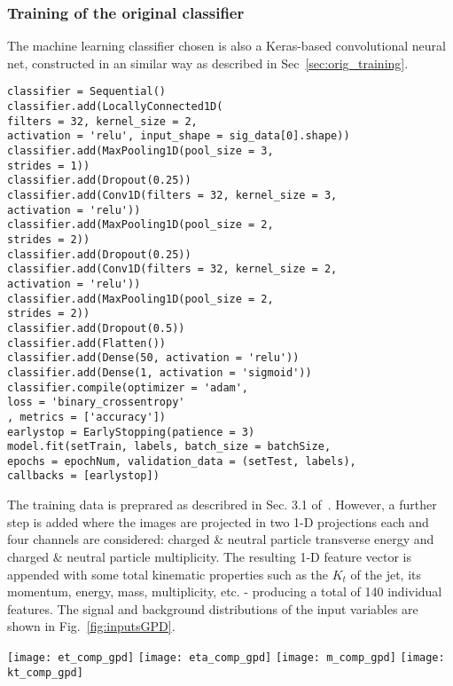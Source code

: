 \subsubsection{Training of the original classifier}

The machine learning classifier chosen is also a Keras-based convolutional neural net,
constructed in an similar way as described in Sec~\ref{sec:orig_training}.
\begin{lstlisting}
classifier = Sequential()
classifier.add(LocallyConnected1D(
filters = 32, kernel_size = 2,
activation = 'relu', input_shape = sig_data[0].shape))
classifier.add(MaxPooling1D(pool_size = 3,
strides = 1))
classifier.add(Dropout(0.25))
classifier.add(Conv1D(filters = 32, kernel_size = 3,
activation = 'relu'))
classifier.add(MaxPooling1D(pool_size = 2,
strides = 2))
classifier.add(Dropout(0.25))
classifier.add(Conv1D(filters = 32, kernel_size = 2,
activation = 'relu'))
classifier.add(MaxPooling1D(pool_size = 2,
strides = 2))
classifier.add(Dropout(0.5))
classifier.add(Flatten())
classifier.add(Dense(50, activation = 'relu'))
classifier.add(Dense(1, activation = 'sigmoid'))
classifier.compile(optimizer = 'adam',
loss = 'binary_crossentropy'
, metrics = ['accuracy'])
earlystop = EarlyStopping(patience = 3)
model.fit(setTrain, labels, batch_size = batchSize,
epochs = epochNum, validation_data = (setTest, labels),
callbacks = [earlystop])
\end{lstlisting}

The training data is preprared as describred in Sec. 3.1 of~\cite{Komiske:2016rsd}. However,
a further step is added where the images are projected in two 1-D projections each and
four channels are considered: charged \& neutral particle transverse energy and charged \& neutral
particle multiplicity. The resulting 1-D feature vector is appended with some
total kinematic properties such as the $K_t$ of the jet, its momentum, energy, mass,
multiplicity, etc. - producing a total of 140 individual features.
The signal and background distributions of the input variables
are shown in Fig.~\ref{fig:inputsGPD}.
%
\begin{figure*}[t]
\centering
\texttt{[image: et\_comp\_gpd]}
\texttt{[image: eta\_comp\_gpd]}
\texttt{[image: m\_comp\_gpd]}
\texttt{[image: kt\_comp\_gpd]}
\caption{\small Comparison of the signal and background distributions
used to train the Keras classifier .}
\label{fig:inputsGPD}
\end{figure*}

